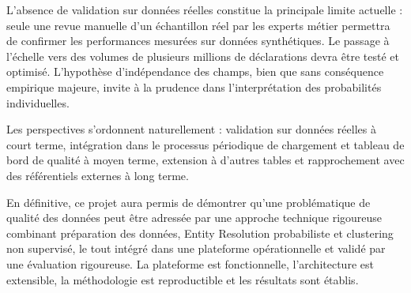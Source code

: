 L'absence de validation sur donn\'{e}es r\'{e}elles constitue la principale limite actuelle : seule une revue manuelle d'un \'{e}chantillon r\'{e}el par les experts m\'{e}tier permettra de confirmer les performances mesur\'{e}es sur donn\'{e}es synth\'{e}tiques. Le passage \`{a} l'\'{e}chelle vers des volumes de plusieurs millions de d\'{e}clarations devra \^{e}tre test\'{e} et optimis\'{e}. L'hypoth\`{e}se d'ind\'{e}pendance des champs, bien que sans cons\'{e}quence empirique majeure, invite \`{a} la prudence dans l'interpr\'{e}tation des probabilit\'{e}s individuelles.

Les perspectives s'ordonnent naturellement : validation sur donn\'{e}es r\'{e}elles \`{a} court terme, int\'{e}gration dans le processus p\'{e}riodique de chargement et tableau de bord de qualit\'{e} \`{a} moyen terme, extension \`{a} d'autres tables et rapprochement avec des r\'{e}f\'{e}rentiels externes \`{a} long terme.

\bigskip
\noindent En d\'{e}finitive, ce projet aura permis de d\'{e}montrer qu'une probl\'{e}matique de qualit\'{e} des donn\'{e}es peut \^{e}tre adress\'{e}e par une approche technique rigoureuse combinant pr\'{e}paration des donn\'{e}es, Entity Resolution probabiliste et clustering non supervis\'{e}, le tout int\'{e}gr\'{e} dans une plateforme op\'{e}rationnelle et valid\'{e} par une \'{e}valuation rigoureuse. La plateforme est fonctionnelle, l'architecture est extensible, la m\'{e}thodologie est reproductible et les r\'{e}sultats sont \'{e}tablis.
